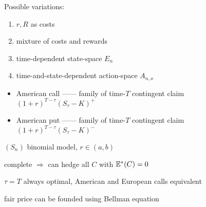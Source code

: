 \begin{fact}
    Possible variations:
    \begin{enumerate}
        \item $r, R$ as costs
        \item mixture of costs and rewards
        \item time-dependent state-space $E_n$
        \item time-and-state-dependent action-space $A_{n,x}$
    \end{enumerate}
\end{fact}

\begin{itemize}
    \item American call ------ family of time-$T$ contingent claim $(1 + r)^{T-\tau}(S_\tau - K)^+$
    \item American put ------ family of time-$T$ contingent claim $(1 + r)^{T-\tau}(S_\tau - K)^-$
\end{itemize}

\begin{setting}
    $(S_n)$ binomial model, $r \in (a, b)$
\end{setting}

\begin{fact}
    complete $\Rightarrow$ can hedge all $C$ with $\mathbb{E}^*(C) = 0$
\end{fact}

\begin{example}
    $\tau = T$ always optimal, American and European calls equivalent
\end{example}

\begin{fact}
    fair price can be founded using Bellman equation
\end{fact}